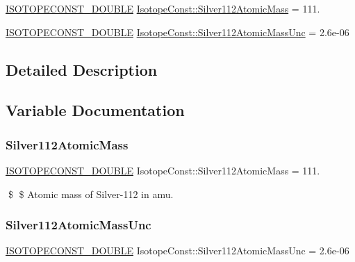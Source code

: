 \begin{DoxyCompactItemize}
\item 
\mbox{\hyperlink{group___isotope_const-_macros_ga8f45a7272ce02c0b4c65c44636ed719a}{I\+S\+O\+T\+O\+P\+E\+C\+O\+N\+S\+T\+\_\+\+D\+O\+U\+B\+LE}} \mbox{\hyperlink{group___isotope_const-_silver-_ag112_gaf40e398c6a21f14d454579764b32d583}{Isotope\+Const\+::\+Silver112\+Atomic\+Mass}} = 111.
\item 
\mbox{\hyperlink{group___isotope_const-_macros_ga8f45a7272ce02c0b4c65c44636ed719a}{I\+S\+O\+T\+O\+P\+E\+C\+O\+N\+S\+T\+\_\+\+D\+O\+U\+B\+LE}} \mbox{\hyperlink{group___isotope_const-_silver-_ag112_gab7e0b3180c6b1d3ae0fe84283aa7e23f}{Isotope\+Const\+::\+Silver112\+Atomic\+Mass\+Unc}} = 2.\+6e-\/06
\end{DoxyCompactItemize}


\subsection{Detailed Description}


\subsection{Variable Documentation}
\mbox{\label{group___isotope_const-_silver-_ag112_gaf40e398c6a21f14d454579764b32d583}} 
\subsubsection{\texorpdfstring{Silver112\+Atomic\+Mass}{Silver112AtomicMass}}
{\footnotesize\ttfamily \mbox{\hyperlink{group___isotope_const-_macros_ga8f45a7272ce02c0b4c65c44636ed719a}{I\+S\+O\+T\+O\+P\+E\+C\+O\+N\+S\+T\+\_\+\+D\+O\+U\+B\+LE}} Isotope\+Const\+::\+Silver112\+Atomic\+Mass = 111.}

\$ \$ Atomic mass of Silver-\/112 in amu. \mbox{\label{group___isotope_const-_silver-_ag112_gab7e0b3180c6b1d3ae0fe84283aa7e23f}} 
\subsubsection{\texorpdfstring{Silver112\+Atomic\+Mass\+Unc}{Silver112AtomicMassUnc}}
{\footnotesize\ttfamily \mbox{\hyperlink{group___isotope_const-_macros_ga8f45a7272ce02c0b4c65c44636ed719a}{I\+S\+O\+T\+O\+P\+E\+C\+O\+N\+S\+T\+\_\+\+D\+O\+U\+B\+LE}} Isotope\+Const\+::\+Silver112\+Atomic\+Mass\+Unc = 2.\+6e-\/06}

